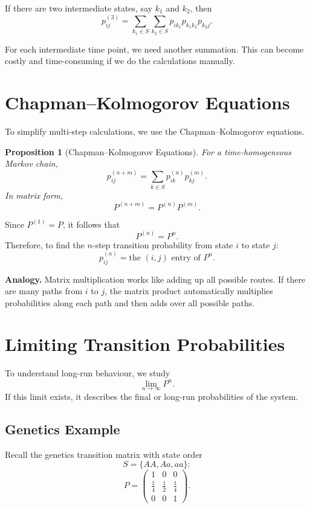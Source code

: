 \documentclass[12pt,a4paper]{article}
\theoremstyle{lecturestyle}
\newtheorem{proposition}{Proposition}
\begin{document}
If there are two intermediate states, say $k_1$ and $k_2$, then
\[
p_{ij}^{(3)}
=
\sum_{k_1\in S}\sum_{k_2\in S}
p_{ik_1}p_{k_1k_2}p_{k_2j}.
\]

For each intermediate time point, we need another summation. This can become costly and time-consuming if we do the calculations manually.

\section{Chapman--Kolmogorov Equations}

To simplify multi-step calculations, we use the Chapman--Kolmogorov equations.

\begin{proposition}[Chapman--Kolmogorov Equations]
For a time-homogeneous Markov chain,
\[
p_{ij}^{(n+m)}
=
\sum_{k\in S}p_{ik}^{(n)}p_{kj}^{(m)}.
\]
In matrix form,
\[
P^{(n+m)}=P^{(n)}P^{(m)}.
\]
\end{proposition}

Since $P^{(1)}=P$, it follows that
\[
P^{(n)}=P^n.
\]
Therefore, to find the $n$-step transition probability from state $i$ to state $j$:
\[
\boxed{p_{ij}^{(n)}=\text{the }(i,j)\text{ entry of }P^n.}
\]

\textbf{Analogy.} Matrix multiplication works like adding up all possible routes. If there are many paths from $i$ to $j$, the matrix product automatically multiplies probabilities along each path and then adds over all possible paths.

\section{Limiting Transition Probabilities}

To understand long-run behaviour, we study
\[
\lim_{n\to\infty}P^n.
\]
If this limit exists, it describes the final or long-run probabilities of the system.

\subsection{Genetics Example}

Recall the genetics transition matrix with state order
\[
S=\{AA,Aa,aa\}:
\]
\[
P=
\begin{pmatrix}
1 & 0 & 0\\
\frac14 & \frac12 & \frac14\\
0 & 0 & 1
\end{pmatrix}.
\]
\end{document}

